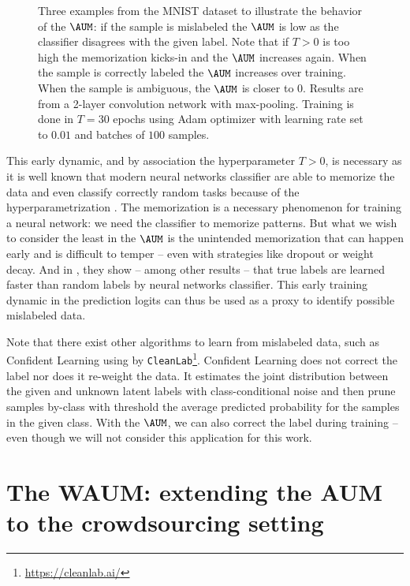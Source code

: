 \begin{figure}[thb]
\begin{center}
\end{center}
\caption{Three examples from the MNIST dataset to illustrate the behavior of the $\AUM$: if the sample is mislabeled the $\AUM$ is low as the classifier disagrees with the given label. Note that if $T>0$ is too high the memorization kicks-in and the $\AUM$ increases again. When the sample is correctly labeled the $\AUM$ increases over training. When the sample is ambiguous, the $\AUM$ is closer to $0$. Results are from a 2-layer convolution network with max-pooling. Training is done in $T=30$ epochs using Adam optimizer with learning rate set to $0.01$ and batches of $100$ samples.}
\label{fig:mnist_aum}
\end{figure}

This early dynamic, and by association the hyperparameter $T>0$, is necessary as it is well known that modern neural networks classifier are able to memorize the data and even classify correctly random tasks because of the hyperparametrization \citep{maennel2020neural}.
The memorization is a necessary phenomenon for training a neural network: we need the classifier to memorize patterns.
But what we wish to consider the least in the $\AUM$ is the unintended memorization \citep{maennel2020neural} that can happen early and is difficult to temper -- even with strategies like dropout or weight decay.
And in \citet{zhang2021understanding}, they show -- among other results -- that true labels are learned faster than random labels by neural networks classifier.
This early training dynamic in the prediction logits can thus be used as a proxy to identify possible mislabeled data.

Note that there exist other algorithms to learn from mislabeled data, such as Confident Learning \citep{northcutt_confident_2021} using by \texttt{CleanLab}\footnote{\url{https://cleanlab.ai/}}.
Confident Learning does not correct the label nor does it re-weight the data.
It estimates the joint distribution between the given and unknown latent labels with class-conditional noise and then prune samples by-class with threshold the average predicted probability for the samples in the given class.
With the $\AUM$, we can also correct the label during training -- even though we will not consider this application for this work.


\section{The WAUM: extending the AUM to the crowdsourcing setting}

